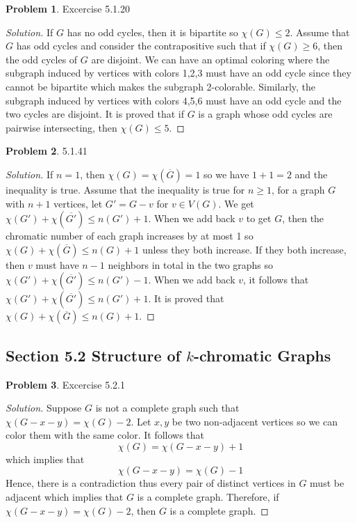 \documentclass[12pt]{article}
\theoremstyle{definition}
\newtheorem{problem}{Problem}
\newenvironment*{solution}{\begin{proof}[Solution]}{\end{proof}}
\begin{document}
\begin{problem}
    Excercise 5.1.20
\end{problem}
\begin{solution}
    If \(G\) has no odd cycles, then it is bipartite so \(\chi(G)\leq2\).
    Assume that \(G\) has odd cycles and consider the contrapositive such that
    if \(\chi(G)\geq6\), then the odd cycles of \(G\) are disjoint.
    We can have an optimal coloring where the subgraph induced by vertices
    with colors 1,2,3 must have an odd cycle since they cannot be bipartite
    which makes the subgraph 2-colorable.
    Similarly, the subgraph induced by vertices with colors 4,5,6 must have an
    odd cycle and the two cycles are disjoint.
    It is proved that if \(G\) is a graph whose odd cycles are pairwise
    intersecting, then \(\chi(G)\leq5\).
\end{solution}

\begin{problem}
    5.1.41
\end{problem}
\begin{solution}
    If \(n=1\), then \(\chi(G)=\chi(\overline{G})=1\) so we have \(1+1=2\) and
    the inequality is true.
    Assume that the inequality is true for \(n\geq1\),
    for a graph \(G\) with \(n+1\) vertices, let \(G'=G-v\) for \(v\in V(G)\).
    We get \(\chi(G')+\chi(\overline{G'})\leq n(G')+1\).
    When we add back \(v\) to get \(G\), then the chromatic number of each
    graph increases by at most 1 so \(\chi(G)+\chi(\overline{G})\leq n(G)+1\)
    unless they both increase.
    If they both increase, then \(v\) must have \(n-1\) neighbors in total in
    the two graphs so \(\chi(G')+\chi(\overline{G'})\leq n(G')-1\).
    When we add back \(v\), it follows that
    \(\chi(G')+\chi(\overline{G'})\leq n(G')+1\).
    It is proved that \(\chi(G)+\chi(\overline{G})\leq n(G)+1\).
\end{solution}

\subsection*{Section 5.2 Structure of \(k\)-chromatic Graphs}
\begin{problem}
    Excercise 5.2.1
\end{problem}
\begin{solution}
    Suppose \(G\) is not a complete graph such that
    \(\chi(G-x-y) = \chi(G)-2\).
    Let \(x,y\) be two non-adjacent vertices so we can color them with the
    same color.
    It follows that \[\chi(G) = \chi(G-x-y)+1\] which implies that
    \[\chi(G-x-y) = \chi(G)-1\]
    Hence, there is a contradiction thus every pair of distinct vertices in
    \(G\) must be adjacent which implies that \(G\) is a complete graph.
    Therefore, if \(\chi(G-x-y) = \chi(G)-2\), then \(G\) is a complete graph.
\end{solution}
\end{document}
